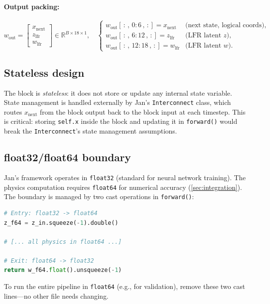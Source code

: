 \documentclass[11pt,a4paper]{article}
\newcommand{\R}{\mathbb{R}}
\begin{document}
\paragraph{Output packing:}
\begin{equation}
w_{\text{out}} = \begin{bmatrix} x_{\text{next}} \\ z_{\text{lfr}} \\ w_{\text{lfr}} \end{bmatrix} \in \R^{B \times 18 \times 1},
\quad
\begin{cases}
w_{\text{out}}[\,:\,,\, 0\!:\!6\,,\, :] = x_{\text{next}} & \text{(next state, logical coords)}, \\
w_{\text{out}}[\,:\,,\, 6\!:\!12\,,\, :] = z_{\text{lfr}} & \text{(LFR latent $z$)}, \\
w_{\text{out}}[\,:\,,\, 12\!:\!18\,,\, :] = w_{\text{lfr}} & \text{(LFR latent $w$)}.
\end{cases}
\end{equation}

\subsection{Stateless design}

The block is \emph{stateless}: it does not store or update any internal state variable.
State management is handled externally by Jan's \texttt{Interconnect} class, which routes
$x_{\text{next}}$ from the block output back to the block input at each timestep. This is
critical: storing \texttt{self.x} inside the block and updating it in \texttt{forward()} would
break the \texttt{Interconnect}'s state management assumptions.

\subsection{float32/float64 boundary}

Jan's framework operates in \texttt{float32} (standard for neural network training). The
physics computation requires \texttt{float64} for numerical accuracy (\cref{sec:integration}).
The boundary is managed by two cast operations in \texttt{forward()}:
\begin{lstlisting}[language=Python]
# Entry: float32 -> float64
z_f64 = z_in.squeeze(-1).double()

# [... all physics in float64 ...]

# Exit: float64 -> float32
return w_f64.float().unsqueeze(-1)
\end{lstlisting}
To run the entire pipeline in \texttt{float64} (e.g., for validation), remove these two cast
lines---no other file needs changing.
\end{document}
